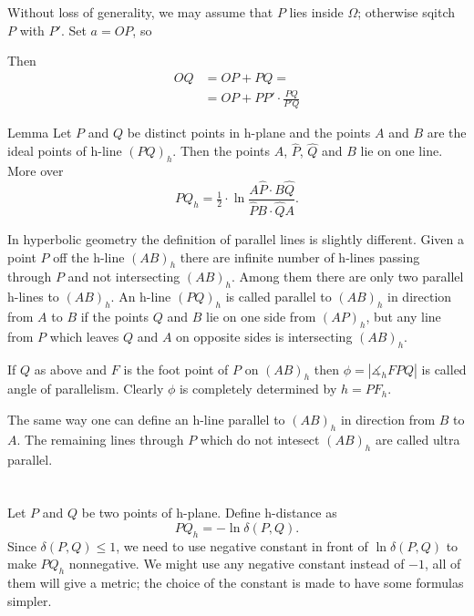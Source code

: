{Without loss of generality, we may assume that $P$ lies inside $\Omega$;
otherwise sqitch $P$ with $P'$.
Set $a=OP$, so

Then 
\begin{align*}
OQ&=OP+PQ=
\\
&=OP+PP'\cdot \frac{PQ}{P'Q}
\end{align*}


\qeds



\begin{thm}{Lemma}
Let $P$ and $Q$ be distinct points in h-plane and the points $A$ and $B$ are the ideal points of h-line $(PQ)_h$.
Then the points $A$, $\hat P$, $\hat Q$ and $B$ lie on one line.
More over 
$$PQ_h=\tfrac12\cdot\ln\frac{A\hat P\cdot B\hat Q}{\hat PB\cdot \hat QA}.$$
\end{thm}

 
 
 
 
 
 
 
 
 
 In hyperbolic geometry the definition of parallel lines is slightly different.
Given a point $P$ off the h-line $(AB)_h$ 
there are infinite number of h-lines passing through $P$ and not intersecting $(AB)_h$. 
Among them there are only two parallel h-lines to $(AB)_h$. 
An h-line $(PQ)_h$ is called parallel to $(AB)_h$
in direction from $A$ to $B$ if the points $Q$ and $B$ lie on one side from $(AP)_h$, but any line from $P$ which leaves $Q$ and $A$ on opposite sides is intersecting $(AB)_h$.

If $Q$ as above and $F$ is the foot point of $P$ on $(AB)_h$ then $\phi=|\measuredangle_h FPQ|$ is called angle of parallelism.
Clearly $\phi$ is completely determined by $h=PF_h$.

The same way one can define an h-line parallel to $(AB)_h$
in direction from $B$ to $A$.
The remaining lines through $P$ which do not intesect $(AB)_h$ are called ultra parallel.












\section{}

Let $P$ and $Q$ be two points of h-plane.
Define h-distance  as 
$$PQ_h=-\ln\delta(P,Q).$$
Since $\delta(P,Q)\le 1$, we need to use negative constant in front of $\ln\delta(P,Q)$ to make $PQ_h$ nonnegative.
We might use any negative constant instead of $-1$, all of them will give a metric; the choice of the constant is made to have some formulas simpler.


}
